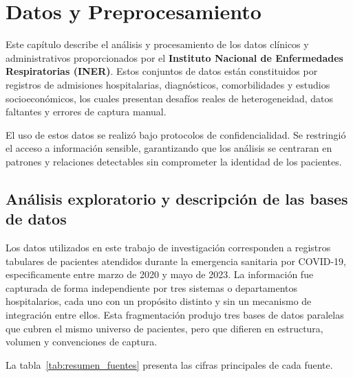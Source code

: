 \chapter{Datos y Preprocesamiento}
\label{cap:datos}

Este capítulo describe el análisis y procesamiento de los datos clínicos y administrativos proporcionados por el \textbf{Instituto Nacional de Enfermedades Respiratorias (INER)}. Estos conjuntos de datos están constituidos por registros de admisiones hospitalarias, diagnósticos, comorbilidades y estudios socioeconómicos, los cuales presentan desafíos reales de heterogeneidad, datos faltantes y errores de captura manual.

El uso de estos datos se realizó bajo protocolos de confidencialidad. Se restringió el acceso a información sensible, garantizando que los análisis se centraran en patrones y relaciones detectables sin comprometer la identidad de los pacientes.

\section{Análisis exploratorio y descripción de las bases de datos}

Los datos utilizados en este trabajo de investigación corresponden a registros tabulares de pacientes atendidos durante la emergencia sanitaria por COVID-19, especificamente entre marzo de 2020 y mayo de 2023. La información fue capturada de forma independiente por tres sistemas o departamentos hospitalarios, cada uno con un propósito distinto y sin un mecanismo de integración entre ellos. Esta fragmentación produjo tres bases de datos paralelas que cubren el mismo universo de pacientes, pero que difieren en estructura, volumen y convenciones de captura.

La tabla~\ref{tab:resumen_fuentes} presenta las cifras principales de cada fuente.

